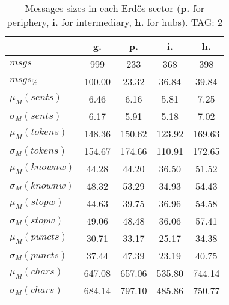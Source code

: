 \begin{table}[h!]
\begin{center}
\begin{tabular}{| l || c | c | c | c |}\hline
 & {\bf g.} & {\bf p.} & {\bf i.} & {\bf h.} \\\hline\hline
$msgs$ & 999  & 233  & 368  & 398 \\
$msgs_{\%}$ & 100.00  & 23.32  & 36.84  & 39.84 \\\hline
$\mu_M(sents)$ & 6.46  & 6.16  & 5.81  & 7.25 \\
$\sigma_M(sents)$ & 6.17  & 5.91  & 5.18  & 7.02 \\\hline
$\mu_M(tokens)$ & 148.36  & 150.62  & 123.92  & 169.63 \\
$\sigma_M(tokens)$ & 154.67  & 174.66  & 110.91  & 172.65 \\\hline
$\mu_M(knownw)$ & 44.28  & 44.20  & 36.50  & 51.52 \\
$\sigma_M(knownw)$ & 48.32  & 53.29  & 34.93  & 54.43 \\\hline
$\mu_M(stopw)$ & 44.63  & 39.75  & 36.96  & 54.58 \\
$\sigma_M(stopw)$ & 49.06  & 48.48  & 36.06  & 57.41 \\\hline
$\mu_M(puncts)$ & 30.71  & 33.17  & 25.17  & 34.38 \\
$\sigma_M(puncts)$ & 37.44  & 47.39  & 23.19  & 40.75 \\\hline
$\mu_M(chars)$ & 647.08  & 657.06  & 535.80  & 744.14 \\
$\sigma_M(chars)$ & 684.14  & 797.10  & 485.86  & 750.77 \\\hline
\end{tabular}
\caption{Messages sizes in each Erd\"os sector ({{\bf p.}} for periphery, {{\bf i.}} for intermediary, {{\bf h.}} for hubs). TAG: 2}
\end{center}
\end{table}